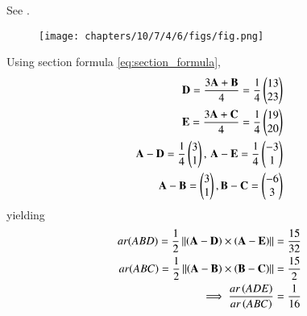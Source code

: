See  
.
\begin{figure}[H]
 \begin{center}
 \texttt{[image: chapters/10/7/4/6/figs/fig.png]}
 \end{center}
\caption{}
\label{fig:chapters/10/7/4/6Fig1}
\end{figure}
	Using section formula
	  \eqref{eq:section_formula},
\begin{align}
\mathbf{D} =\frac{3\mathbf{A}+\mathbf{B}}{4}
	=\frac{1}{4}\begin{pmatrix}13\\ 23\end{pmatrix}
	\\
\mathbf{E} =\frac{3\mathbf{A}+\mathbf{C}}{4}
	=\frac{1}{4}\begin{pmatrix}19\\ 20\end{pmatrix}
	\\
	\mathbf{A}- \mathbf{D} 
	=\frac{1}{4}\begin{pmatrix}3\\ 1\end{pmatrix},\,
	  \mathbf{A}- \mathbf{E}  
	=\frac{1}{4}\begin{pmatrix}-3\\ 1\end{pmatrix}
	\\
	\mathbf{A}- \mathbf{B} =\begin{pmatrix}3\\1\end{pmatrix},
	  \mathbf{B}-\mathbf{C} =\begin{pmatrix}-6\\3\end{pmatrix}
\end{align}
yielding
\begin{align}
ar(ABD) =\frac{1}{2} \left\lVert\left(\mathbf{A}-\mathbf{D}\right)  \times 
   \left(\mathbf{A}- \mathbf{E}\right)\right\rVert 
	=	\frac{15}{32}
	\\
	  ar(ABC) =\frac{1}{2} \left\lVert\left(\mathbf{A}-\mathbf{B}\right)  \times 
   \left(\mathbf{B}- \mathbf{C}\right)\right\rVert 
	=	\frac{15}{2}
	\\
	\implies \frac{ar\left(ADE\right)}{ar\left(ABC\right)}=\frac{1}{16}
\end{align}
